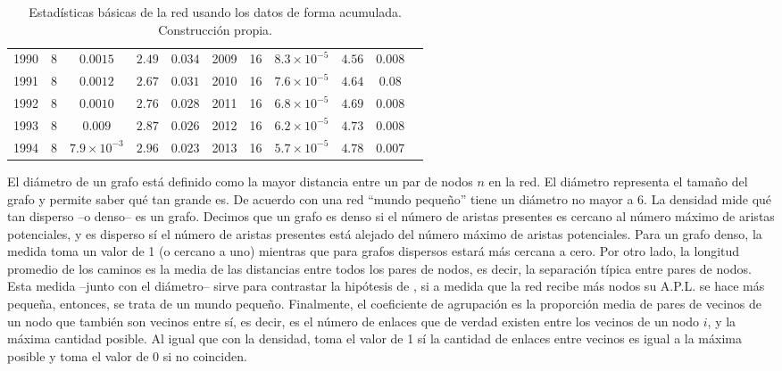 \documentclass[12pt,letter]{article}
\begin{document}
\begin{table}[h!]
{\begin{tabular}{ccccccccccc}
1990 & 8& $0.0015$&$2.49$ &$0.034$ &2009 & 16&$8.3 \times 10^{-5}$ & $4.56$&$0.008$\\
1991 & 8& $0.0012$&$2.67$ &$0.031$ &2010 &16 & $7.6 \times 10^{-5}$& $4.64$&$0.08$\\
1992 & 8& $0.0010$&$2.76$ &$0.028$ &2011 &16 & $6.8 \times 10^{-5}$& $4.69$&$0.008$\\
1993 & 8& $0.009$&$2.87$ &$0.026$ & 2012 &16 & $6.2 \times 10^{-5}$& $4.73$ & $0.008$\\
1994 & 8& $7.9 \times 10^{-3}$&$2.96$ &$0.023$ &2013 &16 & $5.7 \times 10^{-5}$& $4.78$& $0.007$\\ \hline
\end{tabular}
}
\caption{\small{Estadísticas básicas de la red usando los datos de forma acumulada. Construcción propia}.}
\label{c4}
\end{table}

\vspace{0.5cm}

El diámetro de un grafo está definido como la mayor distancia entre un par de nodos $n$ en la red. El diámetro representa el tamaño del grafo y permite saber qué tan grande es. De acuerdo con \cite{Watts} una red ``mundo pequeño'' tiene un diámetro no mayor a 6. La densidad mide qué tan disperso --o denso-- es un grafo. Decimos que un grafo es denso si el número de aristas presentes es cercano al número máximo de aristas potenciales, y es disperso sí el número de aristas presentes está alejado del número máximo de aristas potenciales. Para un grafo denso, la medida toma un valor de 1 (o cercano a uno) mientras que para grafos dispersos estará más cercana a cero. Por otro lado, la longitud promedio de los caminos es la media de las distancias entre todos los pares de nodos, es decir, la separación típica entre pares de nodos. Esta medida --junto con el diámetro-- sirve para contrastar la hipótesis de \cite{Watts}, si a medida que la red recibe más nodos su A.P.L. se hace más pequeña, entonces, se trata de un mundo pequeño. Finalmente, el coeficiente de agrupación es la proporción media de pares de vecinos de un nodo que también son vecinos entre sí, es decir, es el número de enlaces que de verdad existen entre los vecinos de un nodo $i$, y la máxima cantidad posible. Al igual que con la densidad, toma el valor de 1 sí la cantidad de enlaces entre vecinos es igual a la máxima posible y toma el valor de 0 si no coinciden.


\vspace{0.5cm}
\end{document}
